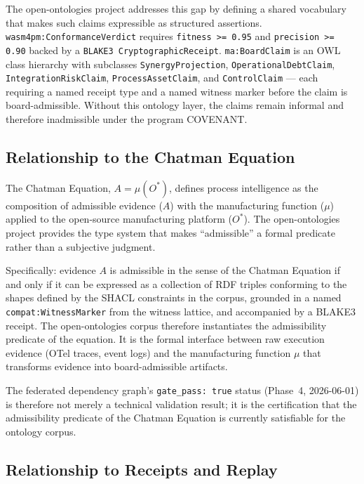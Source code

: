 The open-ontologies project addresses this gap by defining a shared vocabulary that makes
such claims expressible as structured assertions. \texttt{wasm4pm:ConformanceVerdict}
requires \texttt{fitness >= 0.95} and \texttt{precision >= 0.90} backed by a
\texttt{BLAKE3 CryptographicReceipt}. \texttt{ma:BoardClaim} is an OWL class hierarchy
with subclasses \texttt{SynergyProjection}, \texttt{OperationalDebtClaim},
\texttt{IntegrationRiskClaim}, \texttt{ProcessAssetClaim}, and \texttt{ControlClaim} ---
each requiring a named receipt type and a named witness marker before the claim is
board-admissible. Without this ontology layer, the claims remain informal and therefore
inadmissible under the program COVENANT.

\subsection{Relationship to the Chatman Equation}
\label{sec:research-open-ontologies-chatman-equation}

The Chatman Equation, $A = \mu(O^*)$, defines process intelligence as the composition of
admissible evidence ($A$) with the manufacturing function ($\mu$) applied to the open-source
manufacturing platform ($O^*$). The open-ontologies project provides the type system that
makes ``admissible'' a formal predicate rather than a subjective judgment.

Specifically: evidence $A$ is admissible in the sense of the Chatman Equation if and only if
it can be expressed as a collection of RDF triples conforming to the shapes defined by the
SHACL constraints in the corpus, grounded in a named \texttt{compat:WitnessMarker} from the
witness lattice, and accompanied by a BLAKE3 receipt. The open-ontologies corpus therefore
instantiates the admissibility predicate of the equation. It is the formal interface between
raw execution evidence (OTel traces, event logs) and the manufacturing function $\mu$ that
transforms evidence into board-admissible artifacts.

The federated dependency graph's \texttt{gate\_pass: true} status (Phase~4, 2026-06-01) is
therefore not merely a technical validation result; it is the certification that the
admissibility predicate of the Chatman Equation is currently satisfiable for the ontology corpus.

\subsection{Relationship to Receipts and Replay}
\label{sec:research-open-ontologies-receipts-replay}


